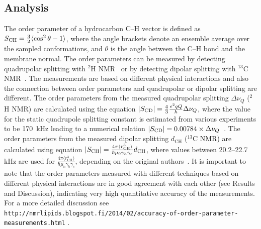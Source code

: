 \documentclass[pre,aps,floatfix,authordate1-4,twocolumn]{revtex4-1}
\begin{document}
\subsection{Analysis}
The order parameter of a hydrocarbon C--H vector is defined as $S_{{\rm CH}}=\frac{3}{2}\langle \cos^2 \theta-1 \rangle$, where
the angle brackets denote an ensemble average over the sampled conformations, and $\theta$ is the angle between the C--H bond and the membrane normal.
The order parameters can be measured by detecting quadrupolar splitting with $^2$H NMR~\cite{seelig77c} or by detecting dipolar 
splitting with $^{13}$C NMR~\cite{hong95a,gross97,dvinskikh05a,ferreira13}. The measurements are based on
different physical interactions and also the connection between order parameters and quadrupolar or dipolar splitting
are different. The order parameters from the measured quadrupolar splitting $\Delta \nu_Q$ ($^2$H NMR) are calculated using 
the equation $|S_{{\rm CD}}|=\frac{4}{3} \frac{e^2qQ}{h} \Delta \nu_Q$, where the value for the static quadrupole
splitting constant is estimated from various experiments to be 170~kHz leading to a numerical relation $|S_{{\rm CD}}|=0.00784 \times \Delta \nu_Q$~\cite{seelig77c}. 
The order parameters from the measured dipolar splitting $d_\mathrm{CH}$ ($^{13}$C NMR) are calculated using equation
$|S_{{\rm CH}}|=\frac{4\pi\langle r_\mathrm{CH}^3 \rangle}{\hbar \mu_0 \gamma_h \gamma_c} d_\mathrm{CH}$, where
values between 20.2--22.7 kHz are used for $\frac{4\pi\langle r_\mathrm{CH}^3 \rangle}{\hbar \mu_0 \gamma_h \gamma_c}$,
depending on the original authors~\cite{hong95a,gross97,dvinskikh05a,ferreira13}.
It is important to note that the order parameters measured with different techniques based on different physical interactions are in good agreement
with each other (see Results and Discussion), indicating very high quantitative accuracy of the measurements.
For a more detailed discussion see \texttt{http://nmrlipids.blogspot.fi/2014/02/accuracy-of-order-parameter-measurements.html}
.
\end{document}
